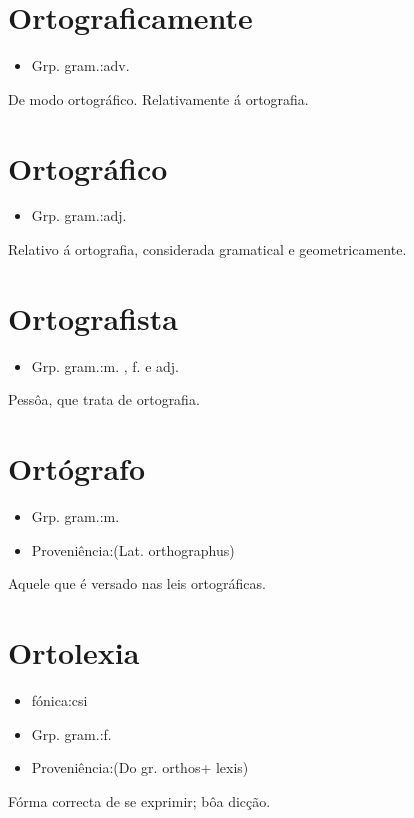 \section{Ortograficamente}
\begin{itemize}
\item {Grp. gram.:adv.}
\end{itemize}
De modo ortográfico.
Relativamente á ortografia.
\section{Ortográfico}
\begin{itemize}
\item {Grp. gram.:adj.}
\end{itemize}
Relativo á ortografia, considerada gramatical e geometricamente.
\section{Ortografista}
\begin{itemize}
\item {Grp. gram.:m. ,  f.  e  adj.}
\end{itemize}
Pessôa, que trata de ortografia.
\section{Ortógrafo}
\begin{itemize}
\item {Grp. gram.:m.}
\end{itemize}
\begin{itemize}
\item {Proveniência:(Lat. \textunderscore orthographus\textunderscore )}
\end{itemize}
Aquele que é versado nas leis ortográficas.
\section{Ortolexia}
\begin{itemize}
\item {fónica:csi}
\end{itemize}
\begin{itemize}
\item {Grp. gram.:f.}
\end{itemize}
\begin{itemize}
\item {Proveniência:(Do gr. \textunderscore orthos\textunderscore  + \textunderscore lexis\textunderscore )}
\end{itemize}
Fórma correcta de se exprimir; bôa dicção.
